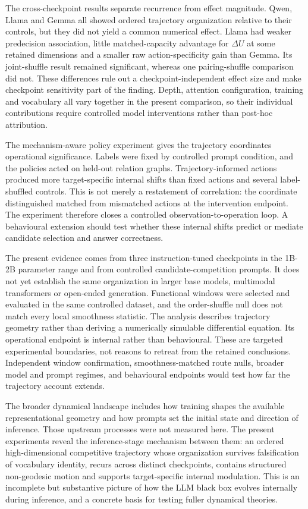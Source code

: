 \documentclass[11pt]{article}
\begin{document}
The cross-checkpoint results separate recurrence from effect magnitude. Qwen, Llama and Gemma all showed ordered trajectory organization relative to their controls, but they did not yield a common numerical effect. Llama had weaker predecision association, little matched-capacity advantage for \(\Delta U\) at some retained dimensions and a smaller raw action-specificity gain than Gemma. Its joint-shuffle result remained significant, whereas one pairing-shuffle comparison did not. These differences rule out a checkpoint-independent effect size and make checkpoint sensitivity part of the finding. Depth, attention configuration, training and vocabulary all vary together in the present comparison, so their individual contributions require controlled model interventions rather than post-hoc attribution.

The mechanism-aware policy experiment gives the trajectory coordinates operational significance. Labels were fixed by controlled prompt condition, and the policies acted on held-out relation graphs. Trajectory-informed actions produced more target-specific internal shifts than fixed actions and several label-shuffled controls. This is not merely a restatement of correlation: the coordinate distinguished matched from mismatched actions at the intervention endpoint. The experiment therefore closes a controlled observation-to-operation loop. A behavioural extension should test whether these internal shifts predict or mediate candidate selection and answer correctness.

The present evidence comes from three instruction-tuned checkpoints in the 1B-2B parameter range and from controlled candidate-competition prompts. It does not yet establish the same organization in larger base models, multimodal transformers or open-ended generation. Functional windows were selected and evaluated in the same controlled dataset, and the order-shuffle null does not match every local smoothness statistic. The analysis describes trajectory geometry rather than deriving a numerically simulable differential equation. Its operational endpoint is internal rather than behavioural. These are targeted experimental boundaries, not reasons to retreat from the retained conclusions. Independent window confirmation, smoothness-matched route nulls, broader model and prompt regimes, and behavioural endpoints would test how far the trajectory account extends.

The broader dynamical landscape includes how training shapes the available representational geometry and how prompts set the initial state and direction of inference. Those upstream processes were not measured here. The present experiments reveal the inference-stage mechanism between them: an ordered high-dimensional competitive trajectory whose organization survives falsification of vocabulary identity, recurs across distinct checkpoints, contains structured non-geodesic motion and supports target-specific internal modulation. This is an incomplete but substantive picture of how the LLM black box evolves internally during inference, and a concrete basis for testing fuller dynamical theories.
\end{document}
